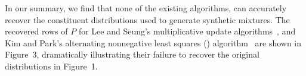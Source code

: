 \documentclass[conference]{IEEEtran}
\begin{document}
In our summary, we find that none of the existing  algorithms, can accurately recover the constituent distributions used to generate synthetic mixtures.
The recovered rows of $P$ for Lee and Seung's multiplicative update algorithms~\cite{Lee01}, and Kim and Park's alternating nonnegative least squares () algorithm~\cite{Kim08} are shown in Figure~3, dramatically illustrating their failure to recover the original distributions in Figure~1.




\end{document}
